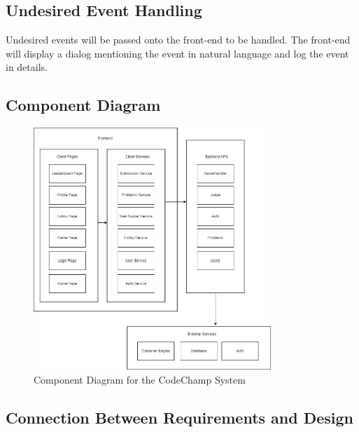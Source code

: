 \documentclass[12pt, titlepage]{article}
\begin{document}
\subsection{Undesired Event Handling}
Undesired events will be passed onto the front-end to be handled. The front-end will display a dialog mentioning the event in natural language and log the event in details.

\subsection{Component Diagram}

\begin{figure}[H]
\centering
\includegraphics[width=0.8\textwidth]{Design/SystDesign/ComponentDiagram.png}
\caption{Component Diagram for the CodeChamp System}
\end{figure}

\subsection{Connection Between Requirements and Design} \label{SecConnection}
\end{document}
